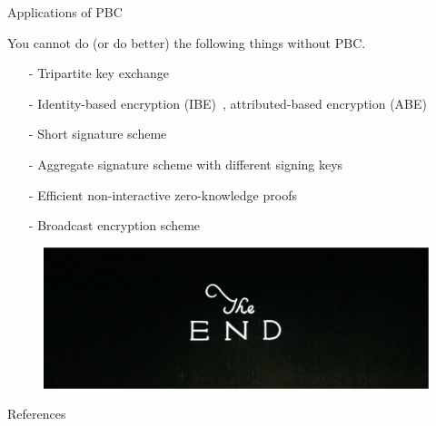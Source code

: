 \documentclass{beamer}
\begin{document}
\begin{frame}{Applications of PBC}

You cannot do (or do better) the following things without PBC.

\begin{itemize}
\item[-] Tripartite key exchange~\cite{Joux2000} 
\item[-] Identity-based encryption (IBE)~\cite{BoFr2003}, 
attributed-based encryption (ABE)
\item[-] Short signature scheme~\cite{BLS2001} 
\item[-] Aggregate signature scheme with different signing keys~\cite{BGLS2003}
\item[-] Efficient non-interactive zero-knowledge proofs \cite{GrSa2008}
\item[-] Broadcast encryption scheme \cite{BoWa2006}

\end{itemize}
\end{frame}



\begin{frame}{}
\begin{figure}[htbp]
\centering
  \includegraphics[width=\textwidth]{img/TheEnd.pdf}
\end{figure}
\end{frame}

\begin{frame}[allowframebreaks]{References}
\tiny


\end{frame}
\end{document}
